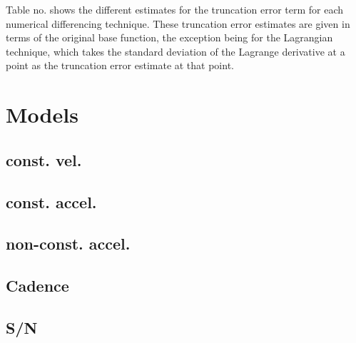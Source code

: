 \documentclass[namedreferences]{SolarPhysics}
\begin{document}
\begin{article}
Table no. shows the different estimates for the truncation error term for each numerical differencing technique. These truncation error estimates are given in terms of the original base function, the exception being for the Lagrangian technique, which takes the standard deviation of the Lagrange derivative at a point as the truncation error estimate at that point.





    
\section{Models} %
 
 \subsection{const. vel.}

\subsection{const. accel.}

\subsection{non-const. accel.}

\subsection{ Cadence}

\subsection{S/N}


\end{article}
\end{document}
